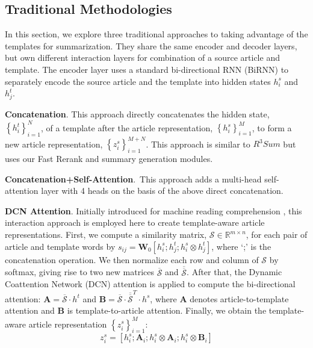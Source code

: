 \documentclass[11pt,a4paper]{article}
\begin{document}
\begin{spacing}{1.0}
\subsection{Traditional Methodologies}\label{section:interaction_methods}
In this section, we explore three traditional approaches to taking advantage of the templates for summarization. They share the same encoder and decoder layers, but own different interaction layers for combination of a source article and template. The encoder layer uses a standard bi-directional RNN (BiRNN) to separately encode the source article and the template into hidden states $h_i^s$ and $h_j^t$.

\noindent\textbf{Concatenation}. This approach directly concatenates the hidden state, $\left \{ h _{i}^t \right \}_{i=1}^{N}$, of a template after the article representation, $\left \{ h _{i}^s \right \}_{i=1}^{M}$, to form a new article representation, $\left \{ z _{i}^s \right \}_{i=1}^{M+N}$. This approach is similar to $R^3Sum$ \cite{cao2018retrieve} but uses our Fast Rerank and summary generation modules.

\noindent\textbf{Concatenation+Self-Attention}.~This approach adds a multi-head self-attention  \cite{Vaswani2017Attention} layer with 4 heads on the basis of the above direct concatenation.

\noindent\textbf{DCN Attention}. Initially introduced for machine reading comprehension \cite{seo2016bidirectional}, this interaction approach is employed here to create template-aware article representations. First, we compute a similarity matrix, $\mathcal{S}\in \mathbb{R}^{m\times n}$, for each pair of article and template words by $s_{ij}=\textbf{W}_0[h_i^s;h_j^t;h_i^s\otimes h_j^t]$, where `;' is the concatenation operation. We then normalize each row and column of $\mathcal{S}$ by softmax, giving rise to two new matrices $\overline{\mathcal{S}}$ and $\overline{\overline{\mathcal{S}}}$. After that, the Dynamic Coattention Network (DCN) attention is applied to compute the bi-directional attention: $\textbf{A}=\overline{\mathcal{S}}\cdot h^t$ and $\textbf{B}=\overline{\mathcal{S}}\cdot \overline{\overline{\mathcal{S}}}^T\cdot h^s$, where $\textbf{A}$ denotes article-to-template attention and $\textbf{B}$ is template-to-article attention. Finally, we obtain the template-aware article representation $\left \{ z _{i}^s \right \}_{i=1}^{M}$:
\begin{equation}
z_i^s=[h_i^s;\textbf{A}_i;h_i^s\otimes \textbf{A}_i;h_i^s\otimes \textbf{B}_i]
\end{equation}


\end{spacing}
\end{document}
